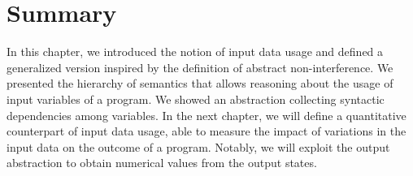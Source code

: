 \section{Summary}

In this chapter, we introduced the notion of input data usage and defined a generalized version inspired by the definition of abstract non-interference.
We presented the hierarchy of semantics that allows reasoning about the usage of input variables of a program.
We showed an abstraction collecting syntactic dependencies among variables.
In the next chapter, we will define a quantitative counterpart of input data usage, able to measure the impact of variations in the input data on the outcome of a program.
Notably, we will exploit the output abstraction to obtain numerical values from the output states.
